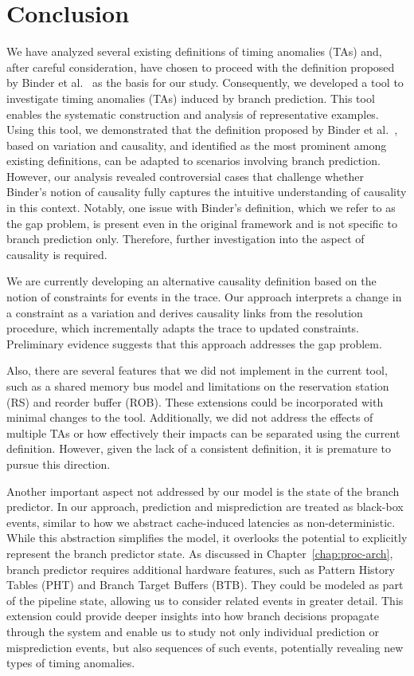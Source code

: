 \chapter{Conclusion}

We have analyzed several existing definitions of timing anomalies (TAs) and, after careful consideration, have chosen to proceed with the definition proposed by Binder et al.~\cite{binder_definitions_2022} as the basis for our study. Consequently, we developed a tool to investigate timing anomalies (TAs) induced by branch prediction. This tool enables the systematic construction and analysis of representative examples. Using this tool, we demonstrated that the definition proposed by Binder et al.~\cite{binder_definitions_2022}, based on variation and causality, and identified as the most prominent among existing definitions, can be adapted to scenarios involving branch prediction. However, our analysis revealed controversial cases that challenge whether Binder's notion of causality fully captures the intuitive understanding of causality in this context. Notably, one issue with Binder's definition, which we refer to as the gap problem, is present even in the original framework and is not specific to branch prediction only. Therefore, further investigation into the aspect of causality is required.

We are currently developing an alternative causality definition based on the notion of constraints for events in the trace. Our approach interprets a change in a constraint as a variation and derives causality links from the resolution procedure, which incrementally adapts the trace to updated constraints. Preliminary evidence suggests that this approach addresses the gap problem.

Also, there are several features that we did not implement in the current tool, such as a shared memory bus model and limitations on the reservation station (RS) and reorder buffer (ROB). These extensions could be incorporated with minimal changes to the tool. Additionally, we did not address the effects of multiple TAs or how effectively their impacts can be separated using the current definition. However, given the lack of a consistent definition, it is premature to pursue this direction.

Another important aspect not addressed by our model is the state of the branch predictor. In our approach, prediction and misprediction are treated as black-box events, similar to how we abstract cache-induced latencies as non-deterministic. While this abstraction simplifies the model, it overlooks the potential to explicitly represent the branch predictor state. As discussed in Chapter~\ref{chap:proc-arch}, branch predictor requires additional hardware features, such as Pattern History Tables (PHT) and Branch Target Buffers (BTB). They could be modeled as part of the pipeline state, allowing us to consider related events in greater detail. This extension could provide deeper insights into how branch decisions propagate through the system and enable us to study not only individual prediction or misprediction events, but also sequences of such events, potentially revealing new types of timing anomalies.
